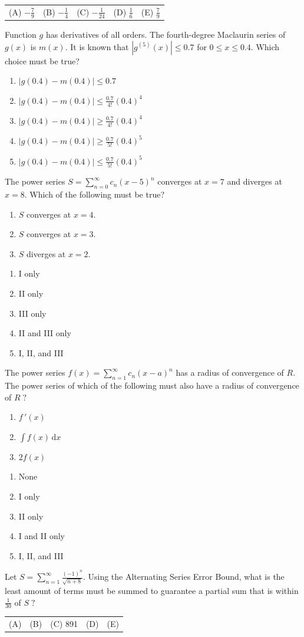\documentclass[letterstyle,12pt]{extarticle}
\newcounter{qcounter}
\newcommand{\di}{\, \text{d}}
\newcommand{\choices}[5]{
\vspace{0.8em} 
\begin{enumerate}[label=(\Alph*)]
\setlength\itemsep{1em} 
\item
#1 
\item 
#2
\item
#3
\item
#4
\item
#5
\end{enumerate}
}
\newcommand{\choicesline}[5]{    
\vspace{2em} \break 
\begin{tabularx}{0.95 \textwidth} { 
>{\arraybackslash}X 
>{\arraybackslash}X 
>{\arraybackslash}X 
>{\arraybackslash}X 
>{\arraybackslash}X }
(A) \; #1
& 
(B) \; #2
& 
(C) \; #3
& 
(D) \; #4
&
(E) \; #5 
\end{tabularx}
\vspace{2em} \break
}
\newcommand{\ans}[1]{{\color{black} #1}}
\newenvironment{question}
    {\begin{minipage}{0.9 \textwidth}
        \item
    }
    { 
    \end{minipage} \vspace{4ex}
    }
\newcommand{\romanlist}[1]{\begin{enumerate}[label=\Roman*., leftmargin=15mm] #1 \end{enumerate}}
\begin{document}
\begin{list}{\textbf{.}~}{}
\begin{question}
\choicesline
{\(-\frac{7}{9}\)}
{\(-\frac{1}{4}\)}
{\(-\frac{1}{24}\)}
{\(\frac{1}{6}\)}
{\ans{\(\frac{7}{9}\)}}
\end{question}

\clearpage 

\begin{question}
Function \(g\) has derivatives of all orders. The fourth-degree Maclaurin series of \(g(x)\) is \(m(x).\) It is known that \(|g^{(5)}(x)| \leqslant 0.7\) for \(0 \leqslant x \leqslant 0.4.\) Which choice must be true?

\choices
{\(\left| g(0.4) - m(0.4) \right| \leqslant 0.7\)}
{\(\left| g(0.4) - m(0.4) \right| \leqslant \frac{0.7}{4!} (0.4)^4\)}
{\(\left| g(0.4) - m(0.4) \right| \geqslant \frac{0.7}{4!} (0.4)^4\)}
{\(\left| g(0.4) - m(0.4) \right| \geqslant \frac{0.7}{5!} (0.4)^5\)}
{\ans{\(\left| g(0.4) - m(0.4) \right| \leqslant \frac{0.7}{5!} (0.4)^5\)}}
\end{question}

\begin{question}
The power series \(S = \sum_{n = 0}^\infty c_n (x - 5)^n\) converges at \(x = 7\) and diverges at \(x = 8.\) Which of the following must be true?
\romanlist{
\item
\(S\) converges at \(x = 4.\)
\item
\(S\) converges at \(x = 3.\)
\item 
\(S\) diverges at \(x = 2.\)

}
\choices
{\ans{I only}}
{II only}
{III only}
{II and III only}
{I, II, and III}
\end{question}

\begin{question}
The power series \(f(x) = \sum_{n = 1}^\infty c_n (x - a)^n\) has a radius of convergence of \(R.\) The power series of which of the following must also have a radius of convergence of \(R \; ?\)
\romanlist{
\item
\(f \, '(x)\)
\item
\(\int f(x) \di x\)
\item
\(2f(x)\)
}

\choices
{None}
{I only}
{II only}
{\ans{I and II only}}
{I, II, and III}
\end{question}

\begin{question}
Let \(S = \sum_{n = 1}^\infty \frac{(-1)^n}{\sqrt{n + 8}}.\) Using the Alternating Series Error Bound, what is the least amount of terms must be summed to guarantee a partial sum that is within \(\frac{1}{30}\) of \(S \; ?\)
\choicesline
{22}
{30}
{\ans{891}}
{900}
{908}
\end{question}


\end{list}
\end{document}
